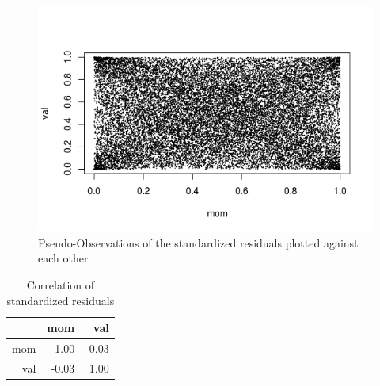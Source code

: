 \documentclass[12pt,letterpaper]{memoir}
\begin{document}
\begin{figure}
\includegraphics[scale=1]{stres}
\caption{Pseudo-Observations of the standardized residuals plotted against each other}
\end{figure}
\begin{table}[ht]
\centering
\caption{Correlation of standardized residuals}
\begin{tabular}{rrr}
  \hline
 & mom & val \\ 
  \hline
mom & 1.00 & -0.03 \\ 
  val & -0.03 & 1.00 \\ 
   \hline
\end{tabular}
\end{table}
\end{document}
